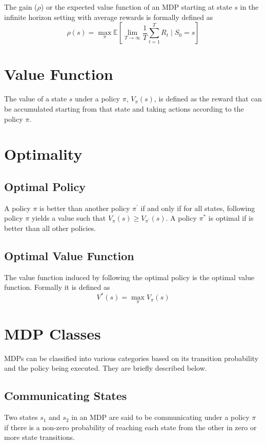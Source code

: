 The gain ($\rho$) or the expected value function of an MDP starting at state $s$ in the infinite horizon setting with average rewards is formally defined as
$$\rho(s) = \max_\pi \mathbb{E}\left[\lim_{T \to \infty} \frac{1}{T} \sum_{t=1}^{T} R_t \mid S_0 = s\right]$$

\section{Value Function}

The value of a state $s$ under a policy $\pi$, $V_\pi(s)$, is defined as the reward that can be accumulated starting from that state and taking actions according to the policy $\pi$. 

\section{Optimality}

\subsection{Optimal Policy}

A policy $\pi$ is better than another policy $\pi^\prime$ if and only if for all states, following policy $\pi$ yields a value such that $V_\pi(s) \ge V_{\pi^\prime} (s)$.
A policy $\pi^*$ is optimal if is better than all other policies.

\subsection{Optimal Value Function}

The value function induced by following the optimal policy is the optimal value function. Formally it is defined as
$$V^*(s) = \max_\pi V_\pi(s)$$

\section{MDP Classes}

MDPs can be classified into various categories based on its transition probability and the policy being executed. They are briefly described below.

\subsection{Communicating States}

Two states $s_1$ and $s_2$ in an MDP are said to be communicating under a policy $\pi$ if there is a non-zero probability of reaching each state from the other in zero or more state transitions.

